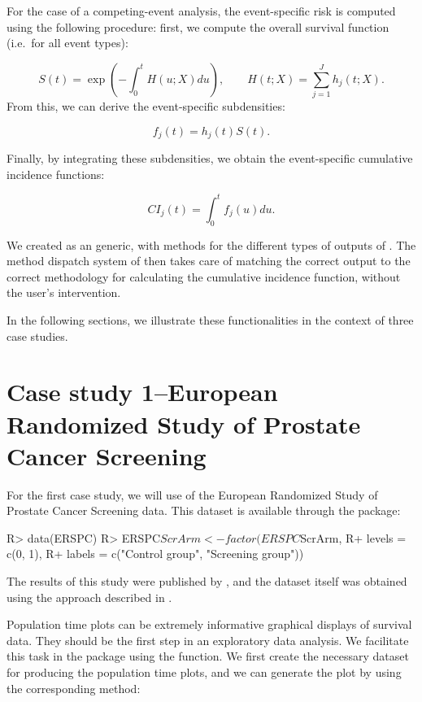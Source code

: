\documentclass[
]{jss}
\begin{document}
For the case of a competing-event analysis, the event-specific risk is
computed using the following procedure: first, we compute the overall
survival function (i.e.~for all event types):

\[ S(t) = \exp\left(-\int_0^t H(u;X) du\right),\qquad H(t;X) = \sum_{j=1}^J h_j(t;X).\]
From this, we can derive the event-specific subdensities:

\[ f_j(t) = h_j(t)S(t).\]

Finally, by integrating these subdensities, we obtain the event-specific
cumulative incidence functions:

\[ CI_j(t) = \int_0^t f_j(u)du.\]

We created  as an  generic, with methods for
the different types of outputs of . The method
dispatch system of  then takes care of matching the correct
output to the correct methodology for calculating the cumulative
incidence function, without the user's intervention.

In the following sections, we illustrate these functionalities in the
context of three case studies.

\hypertarget{case-study-1european-randomized-study-of-prostate-cancer-screening}{%
\section{Case study 1--European Randomized Study of Prostate Cancer
Screening}\label{case-study-1european-randomized-study-of-prostate-cancer-screening}}

For the first case study, we will use of the European Randomized Study
of Prostate Cancer Screening data. This dataset is available through the
 package:

\begin{CodeChunk}

\begin{CodeInput}
R> data(ERSPC)
R> ERSPC$ScrArm <- factor(ERSPC$ScrArm, 
R+                        levels = c(0, 1), 
R+                        labels = c("Control group", "Screening group"))
\end{CodeInput}
\end{CodeChunk}

The results of this study were published by
\citep{schroder2009screening}, and the dataset itself was obtained using
the approach described in \citep{liu2014recovering}.

Population time plots can be extremely informative graphical displays of
survival data. They should be the first step in an exploratory data
analysis. We facilitate this task in the  package using
the  function. We first create the necessary dataset for
producing the population time plots, and we can generate the plot by
using the corresponding  method:
\end{document}

